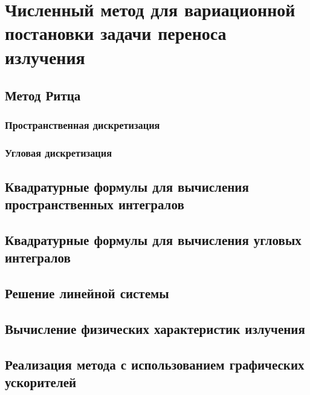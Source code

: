 \chapter{Численный метод для вариационной постановки задачи переноса излучения}

\section{Метод Ритца}
\subsection{Пространственная дискретизация}
\subsection{Угловая дискретизация}

\section{Квадратурные формулы для вычисления пространственных интегралов}
\section{Квадратурные формулы для вычисления угловых интегралов}

\section{Решение линейной системы}

\section{Вычисление физических характеристик излучения}

\section{Реализация метода с использованием графических ускорителей}
